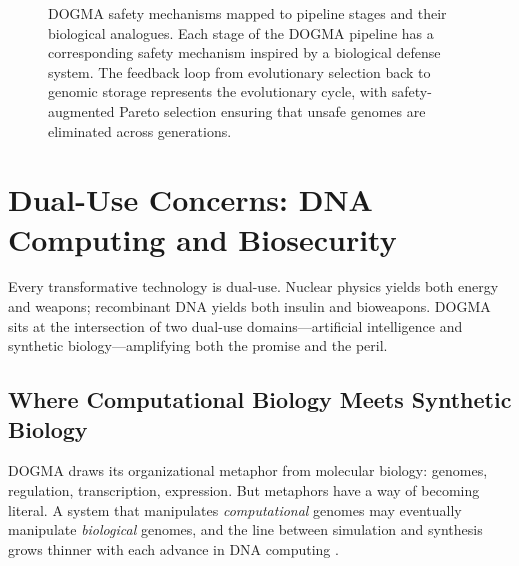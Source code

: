 \begin{figure}[htbp]
\caption{DOGMA safety mechanisms mapped to pipeline stages and their biological analogues. Each stage of the DOGMA pipeline has a corresponding safety mechanism inspired by a biological defense system. The feedback loop from evolutionary selection back to genomic storage represents the evolutionary cycle, with safety-augmented Pareto selection ensuring that unsafe genomes are eliminated across generations.}
\label{fig:dogma-safety-mechanisms}
\end{figure}

\section{Dual-Use Concerns: DNA Computing and Biosecurity}
\label{sec:dual-use}

Every transformative technology is dual-use. Nuclear physics yields both energy and weapons; recombinant DNA yields both insulin and bioweapons.
DOGMA sits at the intersection of two dual-use domains---artificial intelligence and synthetic biology---amplifying both the promise and the peril.

\subsection{Where Computational Biology Meets Synthetic Biology}

DOGMA draws its organizational metaphor from molecular biology: genomes, regulation, transcription, expression.
But metaphors have a way of becoming literal.
A system that manipulates \emph{computational} genomes may eventually manipulate \emph{biological} genomes, and the line between simulation and synthesis grows thinner with each advance in DNA computing \citep{adleman1994}.

